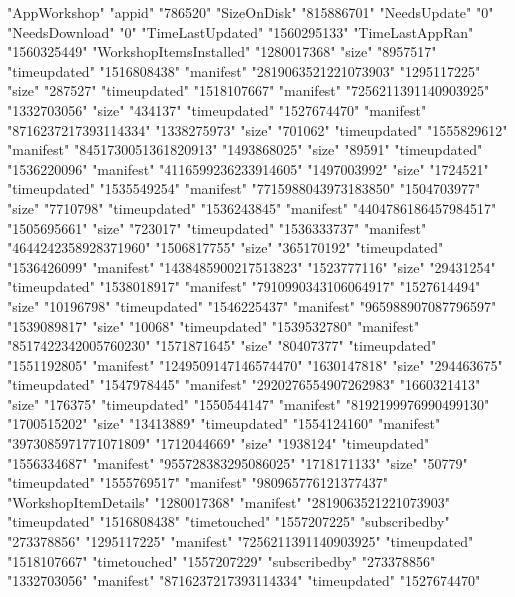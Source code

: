 "AppWorkshop"
{
	"appid"		"786520"
	"SizeOnDisk"		"815886701"
	"NeedsUpdate"		"0"
	"NeedsDownload"		"0"
	"TimeLastUpdated"		"1560295133"
	"TimeLastAppRan"		"1560325449"
	"WorkshopItemsInstalled"
	{
		"1280017368"
		{
			"size"		"8957517"
			"timeupdated"		"1516808438"
			"manifest"		"2819063521221073903"
		}
		"1295117225"
		{
			"size"		"287527"
			"timeupdated"		"1518107667"
			"manifest"		"7256211391140903925"
		}
		"1332703056"
		{
			"size"		"434137"
			"timeupdated"		"1527674470"
			"manifest"		"8716237217393114334"
		}
		"1338275973"
		{
			"size"		"701062"
			"timeupdated"		"1555829612"
			"manifest"		"8451730051361820913"
		}
		"1493868025"
		{
			"size"		"89591"
			"timeupdated"		"1536220096"
			"manifest"		"4116599236233914605"
		}
		"1497003992"
		{
			"size"		"1724521"
			"timeupdated"		"1535549254"
			"manifest"		"7715988043973183850"
		}
		"1504703977"
		{
			"size"		"7710798"
			"timeupdated"		"1536243845"
			"manifest"		"4404786186457984517"
		}
		"1505695661"
		{
			"size"		"723017"
			"timeupdated"		"1536333737"
			"manifest"		"4644242358928371960"
		}
		"1506817755"
		{
			"size"		"365170192"
			"timeupdated"		"1536426099"
			"manifest"		"1438485900217513823"
		}
		"1523777116"
		{
			"size"		"29431254"
			"timeupdated"		"1538018917"
			"manifest"		"7910990343106064917"
		}
		"1527614494"
		{
			"size"		"10196798"
			"timeupdated"		"1546225437"
			"manifest"		"965988907087796597"
		}
		"1539089817"
		{
			"size"		"10068"
			"timeupdated"		"1539532780"
			"manifest"		"8517422342005760230"
		}
		"1571871645"
		{
			"size"		"80407377"
			"timeupdated"		"1551192805"
			"manifest"		"1249509147146574470"
		}
		"1630147818"
		{
			"size"		"294463675"
			"timeupdated"		"1547978445"
			"manifest"		"2920276554907262983"
		}
		"1660321413"
		{
			"size"		"176375"
			"timeupdated"		"1550544147"
			"manifest"		"8192199976990499130"
		}
		"1700515202"
		{
			"size"		"13413889"
			"timeupdated"		"1554124160"
			"manifest"		"3973085971771071809"
		}
		"1712044669"
		{
			"size"		"1938124"
			"timeupdated"		"1556334687"
			"manifest"		"955728383295086025"
		}
		"1718171133"
		{
			"size"		"50779"
			"timeupdated"		"1555769517"
			"manifest"		"980965776121377437"
		}
	}
	"WorkshopItemDetails"
	{
		"1280017368"
		{
			"manifest"		"2819063521221073903"
			"timeupdated"		"1516808438"
			"timetouched"		"1557207225"
			"subscribedby"		"273378856"
		}
		"1295117225"
		{
			"manifest"		"7256211391140903925"
			"timeupdated"		"1518107667"
			"timetouched"		"1557207229"
			"subscribedby"		"273378856"
		}
		"1332703056"
		{
			"manifest"		"8716237217393114334"
			"timeupdated"		"1527674470"
}}}
